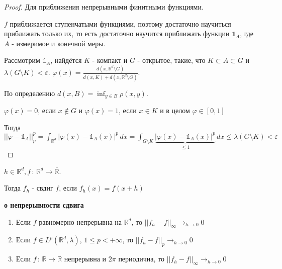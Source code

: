\begin{proof}
    Для приближения непрерывными финитными функциями.

    $f$ приближается ступенчатыми функциями, поэтому достаточно научиться приближать только их, то есть
    достаточно научится приближать функции $\mathds{1}_A$, где $A$ - измеримое и конечной меры.

    Рассмотрим $\mathds{1}_A$, найдётся $K$ - компакт и $G$ - открытое, такие, что $K \subset A \subset G$ и
    $\lambda (G \setminus K) < \varepsilon$. $\varphi (x) = \frac{d(x, \mathbb{R}^d \setminus G)}{d(x, K) + d(x, \mathbb{R}^d \setminus G)}$.

    По определению $d(x, B) = \inf_{y \in B} \rho (x, y)$.

    $\varphi(x) = 0$, если $x \not \in G$ и $\varphi(x) = 1$, если $x \in K$ и в целом $\varphi \in [0, 1]$

    Тогда $||\varphi - \mathds{1}_A||_p^p = \int_{\mathbb{R}^d} |\varphi (x) - \mathds{1}_A (x)|^p \, dx =
    \int_{G \setminus K} \underbrace{|\varphi (x) - \mathds{1}_A(x) |^p}_{\leqslant 1} \, dx \leqslant \lambda (G \setminus K) < \varepsilon$
\end{proof}

\begin{definition}
    $h \in \mathbb{R}^d, f \, : \, \mathbb{R}^d \to \overline{\mathbb{R}}$.

    Тогда $f_h$ - свдиг $f$, если $f_h(x) = f(x + h)$
\end{definition}

\begin{theorem}
    \textbf{о непрерывности сдвига}

    \begin{enumerate}
        \item {
            Если $f$ равномерно непрерывна на $\mathbb{R}^d$, то $||f_h - f||_{\infty} \rightarrow_{h \to 0} 0$
        }
        \item {
            Если $f \in L^p (\mathbb{R}^d, \lambda)$, $1 \leqslant p < +\infty$, то $||f_h - f||_p \rightarrow_{h \to 0} 0$
        }
        \item {
            Если $f \, : \, \mathbb{R} \to \mathbb{R}$ непрерывна и $2\pi$ периодична, то $||f_h - f||_{\infty} \rightarrow_{h \to 0} 0$
        }
    \end{enumerate}
\end{theorem}

